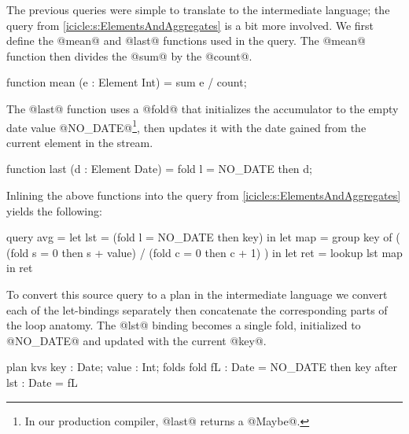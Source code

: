 The previous queries were simple to translate to the intermediate language; the query from \autoref{icicle:s:ElementsAndAggregates} is a bit more involved.
We first define the @mean@ and @last@ functions used in the query.
The @mean@ function then divides the @sum@ by the @count@.
\begin{icicle}
function mean (e : Element Int)
 = sum e / count;
\end{icicle}

The @last@ function uses a @fold@ that initializes the accumulator to the empty date value @NO_DATE@\footnote{In our production compiler, @last@ returns a @Maybe@.}, then updates it with the date gained from the current element in the stream.
\begin{icicle}
function last (d : Element Date)
 = fold l = NO_DATE then d;
\end{icicle}



Inlining the above functions into the query from \autoref{icicle:s:ElementsAndAggregates} yields the following:
\begin{icicle}
query avg
 =    let lst = (fold l = NO_DATE then key)
   in let map = group key of
                ( (fold s = 0 then s + value)
                / (fold c = 0 then c + 1) )
   in let ret = lookup lst map
   in     ret
\end{icicle}

To convert this source query to a plan in the intermediate language we convert each of the let-bindings separately then concatenate the corresponding parts of the loop anatomy.
The @lst@ binding becomes a single fold, initialized to @NO_DATE@ and updated with the current @key@.
\begin{icicle-core}
plan kvs {      key : Date; value : Int;       }
folds    { fold fL  : Date = NO_DATE then key  }
after    {      lst : Date = fL                }
\end{icicle-core}

